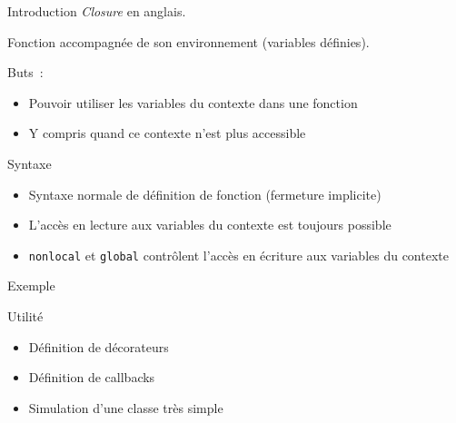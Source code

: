 \begin{frame}{Introduction}
  \textit{Closure} en anglais.

  Fonction accompagnée de son environnement (variables définies).

  Buts~:

  \begin{itemize}[<+->]
    \item Pouvoir utiliser les variables du contexte dans une fonction 
    \item Y compris quand ce contexte n'est plus accessible
  \end{itemize}
\end{frame}

\begin{frame}{Syntaxe}
  \begin{itemize}[<+->]
    \item Syntaxe normale de définition de fonction (fermeture implicite)
    \item L'accès en lecture aux variables du contexte est toujours possible
    \item \texttt{nonlocal} et \texttt{global} contrôlent l'accès en écriture aux variables du contexte
  \end{itemize}
\end{frame}

\begin{frame}{Exemple}
\end{frame}

\begin{frame}{Utilité}
  \begin{itemize}[<+->]
    \item Définition de décorateurs
    \item Définition de callbacks
    \item Simulation d'une classe très simple
  \end{itemize}
\end{frame}
